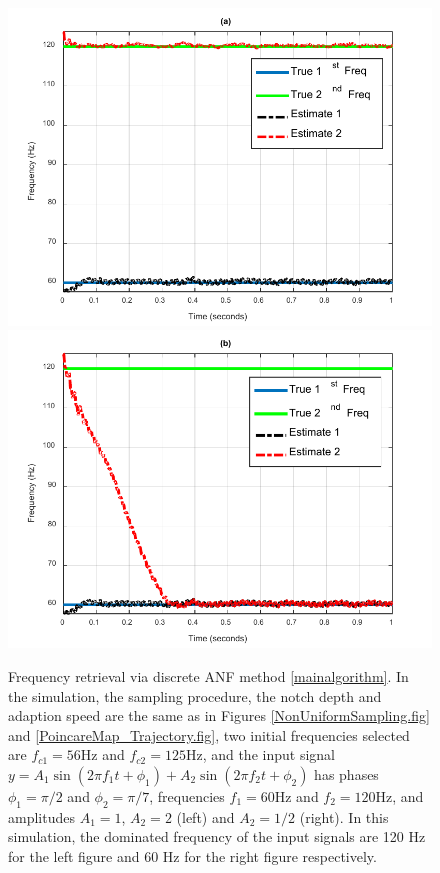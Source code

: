 \documentclass{UCF_ETD}
\begin{document}
\begin{figure}[H]
\begin{center}
\includegraphics[scale=0.75]{NonuniformANF/StaticTwoFreqCascade}
\includegraphics[scale=0.75]{NonuniformANF/StaticTwoFreqParallel}
\caption{Frequency retrieval via discrete ANF method \eqref{mainalgorithm}. In the simulation, the sampling  procedure, the notch  depth  and adaption speed
are the same as in Figures  \ref{NonUniformSampling.fig} and \ref{PoincareMap_Trajectory.fig}, two initial frequencies selected  are $f_{c1} = 56$Hz and $f_{c2} = 125$Hz,
and the input signal $y=A_1\sin (2 \pi f_1 t+\phi_1)+ A_2\sin(2\pi f_2 t+\phi_2)$
has  phases $\phi_1=\pi/2$ and $\phi_2=\pi/7$, frequencies $f_1=60$Hz and $f_2=120$Hz,
and amplitudes $A_1=1$, $A_2=2$ (left) and $A_2=1/2$ (right). In this simulation, the dominated frequency
of the input signals are 120 Hz for the left figure and 60 Hz for the right figure respectively.}
\label{TwoFreqStaticEstimates.fig}
\end{center}
\end{figure}
\end{document}
